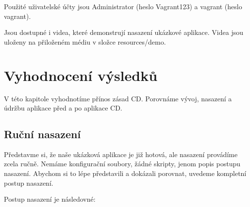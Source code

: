 Použité uživatelské účty jsou Administrator (heslo Vagrant123) a vagrant (heslo vagrant).

Jsou dostupné i videa, které demonstrují nasazení ukázkové aplikace. Videa jsou uloženy na přiloženém médiu v složce resources/demo.

\chapter{Vyhodnocení výsledků}
\label{ch:vyslekdy}
V této kapitole vyhodnotíme přínos zásad CD. Porovnáme vývoj, nasazení a údržbu aplikace před a po aplikace CD.

\section{Ruční nasazení}
Představme si, že naše ukázková aplikace je již hotová, ale nasazení provádíme zcela ručně. Nemáme konfigurační soubory, žádné skripty, jenom popis postupu nasazení. Abychom si to lépe představili a dokázali porovnat, uvedeme kompletní postup nasazení. 

Postup nasazení je následovné:

